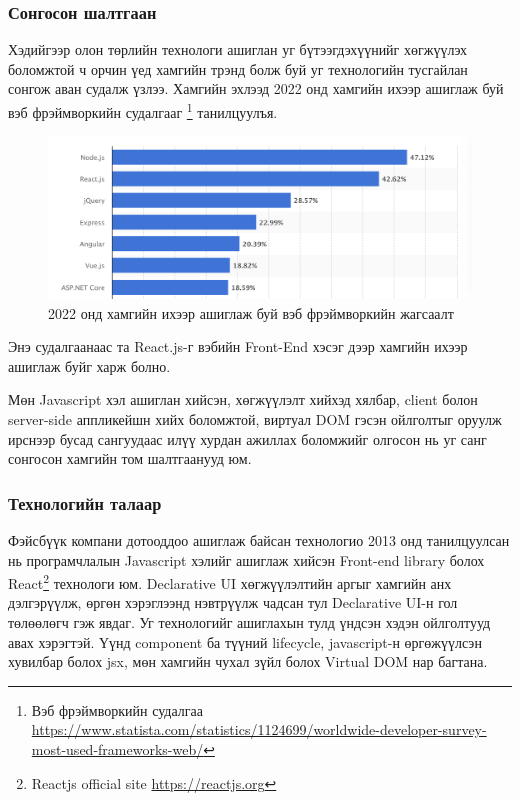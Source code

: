 \subsubsection{Сонгосон шалтгаан}

Хэдийгээр олон төрлийн технологи ашиглан уг бүтээгдэхүүнийг хөгжүүлэх боломжтой ч орчин үед хамгийн трэнд болж буй уг технологийн тусгайлан сонгож аван судалж үзлээ. Хамгийн эхлээд 2022 онд хамгийн ихээр ашиглаж буй вэб фрэймворкийн судалгааг \footnote{Вэб фрэймворкийн судалгаа \url{https://www.statista.com/statistics/1124699/worldwide-developer-survey-most-used-frameworks-web/}} танилцуулъя. 

\begin{figure}[h]
	\centering
	\includegraphics[width=12cm]{images/most-used-frameworks.png}
	\caption{2022 онд хамгийн ихээр ашиглаж буй вэб фрэймворкийн жагсаалт}
	\label{fig:most-used-frameworks}
\end{figure}

Энэ судалгаанаас та React.js-г вэбийн Front-End хэсэг дээр хамгийн ихээр ашиглаж буйг харж болно.

Мөн Javascript хэл ашиглан хийсэн, хөгжүүлэлт хийхэд хялбар, client болон server-side аппликейшн хийх боломжтой, виртуал DOM гэсэн ойлголтыг оруулж ирснээр бусад сангуудаас илүү хурдан ажиллах боломжийг олгосон нь уг санг сонгосон хамгийн том шалтгаанууд юм. 

\subsubsection{Технологийн талаар}

Фэйсбүүк компани дотооддоо ашиглаж байсан технологио 2013 онд танилцуулсан нь програмчлалын Javascript хэлийг ашиглаж хийсэн Front-end library болох React\footnote{Reactjs official site \url{https://reactjs.org}} технологи юм. Declarative UI хөгжүүлэлтийн аргыг хамгийн анх дэлгэрүүлж, өргөн хэрэглээнд нэвтрүүлж чадсан тул Declarative UI-н гол төлөөлөгч гэж явдаг. Уг технологийг ашиглахын тулд үндсэн хэдэн ойлголтууд авах хэрэгтэй. Үүнд component ба түүний lifecycle, javascript-н өргөжүүлсэн хувилбар болох jsx, мөн хамгийн чухал зүйл болох Virtual DOM нар багтана. 

